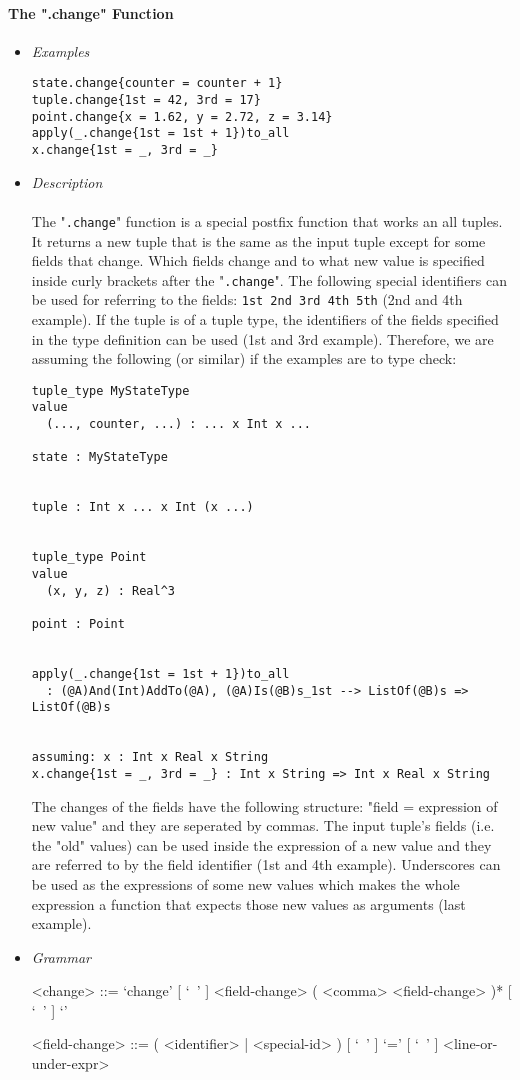 \documentclass{article}
\begin{document}
\paragraph{The ".change" Function}

\begin{itemize}

\item \textit{Examples}

\begin{verbatim}
state.change{counter = counter + 1} 
tuple.change{1st = 42, 3rd = 17}
point.change{x = 1.62, y = 2.72, z = 3.14}
apply(_.change{1st = 1st + 1})to_all
x.change{1st = _, 3rd = _}
\end{verbatim}

\item \textit{Description} \\\\
The "\texttt{.change}" function is a special postfix function that works an all
tuples. It returns a new tuple that is the same as the input tuple except for
some fields that change. Which fields change and to what new value is specified
inside curly brackets after the "\texttt{.change}". The following special
identifiers can be used for referring to the fields: \texttt{1st 2nd 3rd 4th
5th} (2nd and 4th example). If the tuple is of a tuple type, the identifiers of
the fields specified in the type definition can be used (1st and 3rd example).
Therefore, we are assuming the following (or similar) if the examples are to
type check:

\begin{verbatim}
tuple_type MyStateType
value
  (..., counter, ...) : ... x Int x ...

state : MyStateType


tuple : Int x ... x Int (x ...)


tuple_type Point
value
  (x, y, z) : Real^3

point : Point


apply(_.change{1st = 1st + 1})to_all
  : (@A)And(Int)AddTo(@A), (@A)Is(@B)s_1st --> ListOf(@B)s => ListOf(@B)s


assuming: x : Int x Real x String
x.change{1st = _, 3rd = _} : Int x String => Int x Real x String
\end{verbatim}
The changes of the fields have the following structure: "field = expression of
new value" and they are seperated by commas. The input tuple's fields (i.e. the
"old" values) can be used inside the expression of a new value and they are
referred to by the field identifier (1st and 4th example). Underscores can be 
used as the expressions of some new values which makes the whole expression 
a function that expects those new values as arguments (last example).
\item \textit{Grammar}

\begin{grammar}
<change> ::=
`change{' [ `\ ' ] <field-change> ( <comma> <field-change> )* [ `\ ' ] `}'

<field-change> ::=
( <identifier> | <special-id> ) [ `\ ' ] `=' [ `\ ' ] <line-or-under-expr>
\end{grammar} 

\end{itemize}
\end{document}
